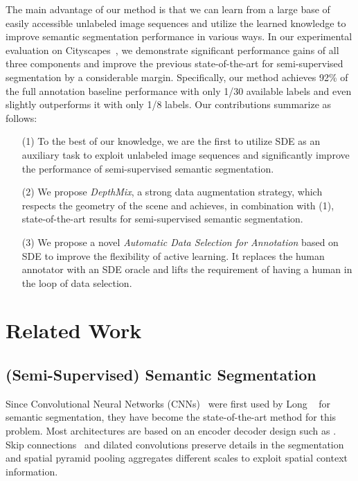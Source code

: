 \documentclass[final]{cvpr}
\begin{document}
The main advantage of our method is that we can learn from a large base of easily accessible unlabeled image sequences and utilize the learned knowledge to improve semantic segmentation performance in various ways. In our experimental evaluation on Cityscapes~\cite{cordts2016cityscapes}, we demonstrate significant performance gains of all three components and improve the previous state-of-the-art for semi-supervised segmentation by a considerable margin. Specifically, our method achieves 92\% of the full annotation baseline performance with only 1/30 available labels and even slightly outperforms it with only 1/8 labels.
Our contributions summarize as follows:
\begin{itemize}[topsep=4pt,itemsep=4pt, parsep=0pt]
    \item[(1)] To the best of our knowledge, we are the first to utilize SDE as an auxiliary task to exploit unlabeled image sequences and significantly improve the performance of semi-supervised semantic segmentation.
    \item[(2)] We propose \emph{DepthMix}, a strong data augmentation strategy, which respects the geometry of the scene and achieves, in combination with (1), state-of-the-art results for semi-supervised semantic segmentation.
    \item[(3)] We propose a novel \emph{Automatic Data Selection for Annotation} based on SDE to improve the flexibility of active learning. It replaces the human annotator with an SDE oracle and lifts the requirement of having a human in the loop of data selection.  
\end{itemize} \section{Related Work}
\label{sec:related_work}

\subsection{(Semi-Supervised) Semantic Segmentation}

Since Convolutional Neural Networks (CNNs)~\cite{lecun1998gradient} were first used by Long \etal~\cite{long2015fully} for semantic segmentation, they have become the state-of-the-art method for this problem. Most architectures are based on an encoder decoder design such as \cite{long2015fully, ronneberger2015u, chen2018encoder}. Skip connections~\cite{ronneberger2015u} and dilated convolutions \cite{chen2014semantic, yu2015multi} preserve details in the segmentation and spatial pyramid pooling \cite{ghiasi2016laplacian, zhao2017pyramid, chen2017deeplab} aggregates different scales to exploit spatial context information. 
\end{document}
